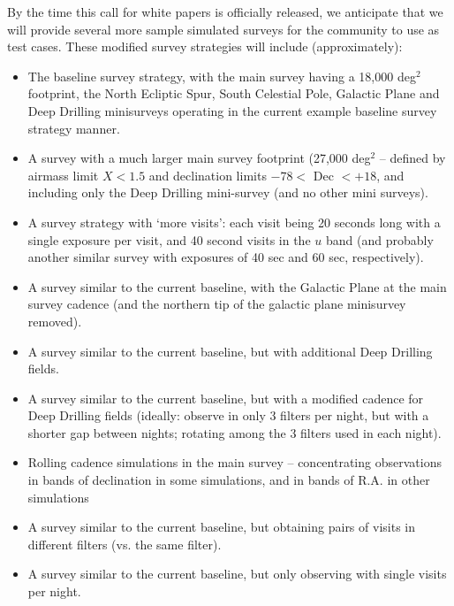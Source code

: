 \documentclass[DM,lsstdraft,toc,usenatbib]{lsstdoc}
\begin{document}
By the time this call for white papers is officially released, we anticipate that we will provide several more sample simulated surveys for the community to use as test cases. These modified survey strategies will include (approximately): 
\begin{itemize}
\item The baseline survey strategy, with the main survey having a 18,000 deg$^2$ footprint, the North Ecliptic Spur, South Celestial Pole, Galactic Plane and Deep Drilling minisurveys operating in the current example baseline survey strategy manner. 
\item A survey with a much larger main survey footprint (27,000 deg$^2$ -- defined by airmass limit $X<1.5$ and declination limits 
$-78<$ Dec $< +18$, and including only the Deep Drilling mini-survey (and no other mini surveys).
\item A survey strategy with `more visits': each visit being 20 seconds long with a single exposure per visit, and 40 second visits in the $u$ band (and probably another similar survey with exposures of 40 sec and 60 sec, respectively). 
\item A survey similar to the current baseline, with the Galactic Plane at the main survey cadence (and the northern tip of the galactic plane minisurvey removed).
\item A survey similar to the current baseline, but with additional Deep Drilling fields.
\item A survey similar to the current baseline, but with a modified cadence for Deep Drilling fields (ideally: observe in only 3 filters per night, but with a shorter gap between nights; rotating among the 3 filters used in each night).
\item Rolling cadence simulations in the main survey -- concentrating observations in bands of declination in some simulations, and in bands of R.A. in other simulations
\item A survey similar to the current baseline, but obtaining pairs of visits in different filters (vs. the same filter).
\item A survey similar to the current baseline, but only observing with single visits per night.
\end{itemize}
\end{document}
